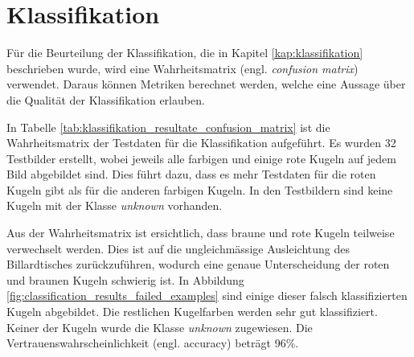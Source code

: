 \clearpage
\section{Klassifikation}
Für die Beurteilung der Klassifikation, die in Kapitel \ref{kap:klassifikation} beschrieben wurde, wird eine
Wahrheitsmatrix \cite{wiki:confusion_matrix} (engl. \emph{confusion matrix}) verwendet.
Daraus können Metriken berechnet werden, welche eine Aussage über die Qualität der Klassifikation erlauben.

In Tabelle \ref{tab:klassifikation_resultate_confusion_matrix} ist die Wahrheitsmatrix der Testdaten
für die Klassifikation aufgeführt. Es wurden 32 Testbilder erstellt, wobei jeweils alle farbigen und einige rote Kugeln
auf jedem Bild abgebildet sind. Dies führt dazu, dass es mehr Testdaten für die roten Kugeln gibt als für die anderen farbigen Kugeln.
In den Testbildern sind keine Kugeln mit der Klasse \emph{unknown} vorhanden.

Aus der Wahrheitsmatrix ist ersichtlich, dass braune und rote Kugeln teilweise verwechselt werden.
Dies ist auf die ungleichmässige Ausleichtung des Billardtisches zurückzuführen, wodurch eine genaue Unterscheidung
der roten und braunen Kugeln schwierig ist.
In Abbildung \ref{fig:classification_results_failed_examples} sind einige dieser falsch klassifizierten Kugeln abgebildet.
Die restlichen Kugelfarben werden sehr gut klassifiziert. Keiner der Kugeln wurde die Klasse \emph{unknown} zugewiesen.
Die Vertrauenswahrscheinlichkeit \cite{wiki:beurteilung_binärer_klassifikator} (engl. accuracy) beträgt 96\%.


